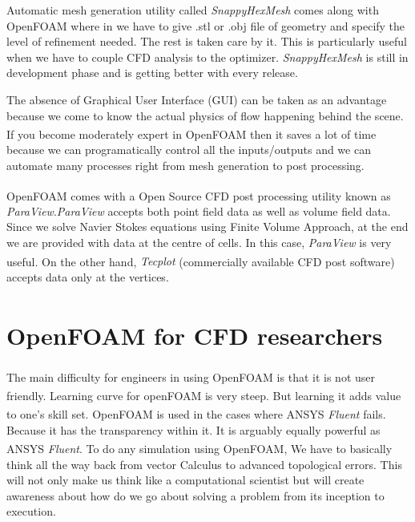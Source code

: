 Automatic mesh generation utility called \textit{SnappyHexMesh} comes along with OpenFOAM where in we have to give .stl or .obj file of geometry and specify the level of refinement needed. The rest is taken care by it. This is particularly useful when we have to couple CFD analysis to the optimizer. \textit{SnappyHexMesh} is still in development phase and is getting better with every release.

The absence of Graphical User Interface (GUI) can be taken as an advantage because we come to know the actual physics of flow happening behind the scene. If you become moderately expert in OpenFOAM\textsuperscript{\textregistered} then it saves a lot of time because we can programatically control all the inputs/outputs and we can automate many processes right from mesh generation to post processing.

OpenFOAM\textsuperscript{\textregistered} comes with a Open Source CFD post processing utility known as \textit{ParaView}.\textit{ParaView} accepts both point field data as well as volume field data. Since we solve Navier Stokes equations using Finite Volume Approach, at the end we are provided with data at the centre of cells. In this case, \textit{ParaView} is very useful. On the other hand, \textit{Tecplot\textsuperscript{\textregistered}} (commercially available CFD post software) accepts data only at the vertices.

\section{OpenFOAM\textsuperscript{\textregistered} for CFD researchers}

The main difficulty for engineers in using OpenFOAM\textsuperscript{\textregistered} is that it is not user friendly. Learning curve for openFOAM\textsuperscript{\textregistered} is very steep. But learning it adds value to one's skill set. OpenFOAM\textsuperscript{\textregistered} is used in the cases where ANSYS\textsuperscript{\textregistered} \textit{Fluent} fails. Because it has the transparency within it. It is arguably equally powerful as ANSYS\textsuperscript{\textregistered} \textit{Fluent}. To do any simulation using OpenFOAM\textsuperscript{\textregistered}, We have to basically think all the way back from vector Calculus to advanced topological errors. This will not only make us think like a computational scientist but will create awareness about how do we go about solving a problem from its inception to execution.



